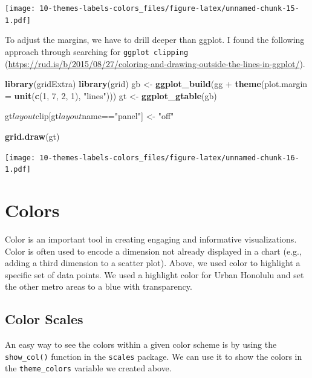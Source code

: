 \documentclass[]{book}
\newenvironment{Shaded}{\begin{snugshade}}{\end{snugshade}}
\newcommand{\KeywordTok}[1]{\textcolor[rgb]{0.13,0.29,0.53}{\textbf{{#1}}}}
\newcommand{\DataTypeTok}[1]{\textcolor[rgb]{0.13,0.29,0.53}{{#1}}}
\newcommand{\DecValTok}[1]{\textcolor[rgb]{0.00,0.00,0.81}{{#1}}}
\newcommand{\StringTok}[1]{\textcolor[rgb]{0.31,0.60,0.02}{{#1}}}
\newcommand{\NormalTok}[1]{{#1}}
\theoremstyle{definition}
\theoremstyle{definition}
\theoremstyle{remark}
\begin{document}
\texttt{[image: 10-themes-labels-colors\_files/figure-latex/unnamed-chunk-15-1.pdf]}

To adjust the margins, we have to drill deeper than ggplot. I found the
following approach through searching for \texttt{ggplot\ clipping}
(\url{https://rud.is/b/2015/08/27/coloring-and-drawing-outside-the-lines-in-ggplot/}).

\begin{Shaded}
\begin{Highlighting}[]
\KeywordTok{library}\NormalTok{(gridExtra)}
\KeywordTok{library}\NormalTok{(grid)}
\NormalTok{gb <-}\StringTok{ }\KeywordTok{ggplot_build}\NormalTok{(gg +}\StringTok{ }\KeywordTok{theme}\NormalTok{(}\DataTypeTok{plot.margin =} \KeywordTok{unit}\NormalTok{(}\KeywordTok{c}\NormalTok{(}\DecValTok{1}\NormalTok{, }\DecValTok{7}\NormalTok{, }\DecValTok{2}\NormalTok{, }\DecValTok{1}\NormalTok{), }\StringTok{"lines"}\NormalTok{)))}
\NormalTok{gt <-}\StringTok{ }\KeywordTok{ggplot_gtable}\NormalTok{(gb)}

\NormalTok{gt$layout$clip[gt$layout$name==}\StringTok{"panel"}\NormalTok{] <-}\StringTok{ "off"}

\KeywordTok{grid.draw}\NormalTok{(gt)}
\end{Highlighting}
\end{Shaded}

\texttt{[image: 10-themes-labels-colors\_files/figure-latex/unnamed-chunk-16-1.pdf]}

\section{Colors}\label{colors}

Color is an important tool in creating engaging and informative
visualizations. Color is often used to encode a dimension not already
displayed in a chart (e.g., adding a third dimension to a scatter plot).
Above, we used color to highlight a specific set of data points. We used
a highlight color for Urban Honolulu and set the other metro areas to a
blue with transparency.

\subsection{Color Scales}\label{color-scales}

An easy way to see the colors within a given color scheme is by using
the \texttt{show\_col()} function in the \texttt{scales} package. We can
use it to show the colors in the \texttt{theme\_colors} variable we
created above.
\end{document}
